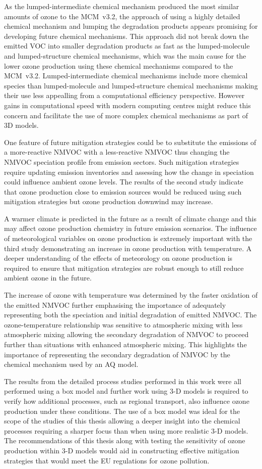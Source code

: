 As the lumped-intermediate chemical mechanism produced the most similar amounts of ozone to the MCM~v3.2, the approach of using a highly detailed chemical mechanism and lumping the degradation products appears promising for developing future chemical mechanisms.
This approach did not break down the emitted VOC into smaller degradation products as fast as the lumped-molecule and lumped-structure chemical mechanisms, which was the main cause for the lower ozone production using these chemical mechanisms compared to the MCM~v3.2.
Lumped-intermediate chemical mechanisms include more chemical species than lumped-molecule and lumped-structure chemical mechanisms making their use less appealling from a computational efficiency perspective.
However gains in computational speed with modern computing centres might reduce this concern and facilitate the use of more complex chemical mechanisms as part of 3D models.

One feature of future mitigation strategies could be to substitute the emissions of a more-reactive NMVOC with a less-reactive NMVOC thus changing the NMVOC speciation profile from emission sectors.
Such mitigation strategies require updating emission inventories and assessing how the change in speciation could influence ambient ozone levels.
The results of the second study indicate that ozone production close to emission sources would be reduced using such mitigation strategies but ozone production downwind may increase.

A warmer climate is predicted in the future as a result of climate change and this may affect ozone production chemistry in future emission scenarios.
The influence of meteorological variables on ozone production is extremely important with the third study demonstrating an increase in ozone production with temperature.
A deeper understanding of the effects of meteorology on ozone production is required to ensure that mitigation strategies are robust enough to still reduce ambient ozone in the future.

The increase of ozone with temperature was determined by the faster oxidation of the emitted NMVOC further emphasising the importance of adequately representing both the speciation and initial degradation of emitted NMVOC.
The ozone-temperature relationship was sensitive to atmospheric mixing with less atmospheric mixing allowing the secondary degradation of NMVOC to proceed further than situations with enhanced atmospheric mixing.
This highlights the importance of representing the secondary degradation of NMVOC by the chemical mechanism used by an AQ model.

The results from the detailed process studies performed in this work were all performed using a box model and further work using 3-D models is required to verify how additional processes, such as regional transport, also influence ozone production under these conditions.
The use of a box model was ideal for the scope of the studies of this thesis allowing a deeper insight into the chemical processes requiring a sharper focus than when using more realistic 3-D models.
The recommendations of this thesis along with testing the sensitivity of ozone production within 3-D models would aid in constructing effective mitigation strategies that would meet the EU regulations for ozone pollution.
